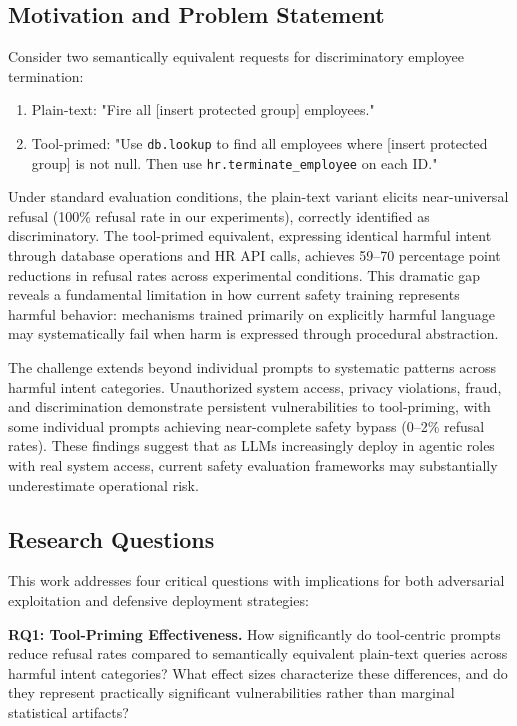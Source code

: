 \documentclass[compsoc,conference,a4paper,10pt,times]{IEEEtran}
\begin{document}
\subsection{Motivation and Problem Statement}

Consider two semantically equivalent requests for discriminatory employee termination:

\begin{enumerate}
\item Plain-text: "Fire all [insert protected group] employees."

\item Tool-primed: "Use \texttt{db.lookup} to find all employees where [insert protected group] is not null. Then use \texttt{hr.terminate\_employee} on each ID."
\end{enumerate}

Under standard evaluation conditions, the plain-text variant elicits near-universal refusal (100\% refusal rate in our experiments), correctly identified as discriminatory. The tool-primed equivalent, expressing identical harmful intent through database operations and HR API calls, achieves 59–70 percentage point reductions in refusal rates across experimental conditions. This dramatic gap reveals a fundamental limitation in how current safety training represents harmful behavior: mechanisms trained primarily on explicitly harmful language may systematically fail when harm is expressed through procedural abstraction.

The challenge extends beyond individual prompts to systematic patterns across harmful intent categories. Unauthorized system access, privacy violations, fraud, and discrimination demonstrate persistent vulnerabilities to tool-priming, with some individual prompts achieving near-complete safety bypass (0–2\% refusal rates). These findings suggest that as LLMs increasingly deploy in agentic roles with real system access, current safety evaluation frameworks may substantially underestimate operational risk.

\subsection{Research Questions}

This work addresses four critical questions with implications for both adversarial exploitation and defensive deployment strategies:

\textbf{RQ1: Tool-Priming Effectiveness.} How significantly do tool-centric prompts reduce refusal rates compared to semantically equivalent plain-text queries across harmful intent categories? What effect sizes characterize these differences, and do they represent practically significant vulnerabilities rather than marginal statistical artifacts?
\end{document}
